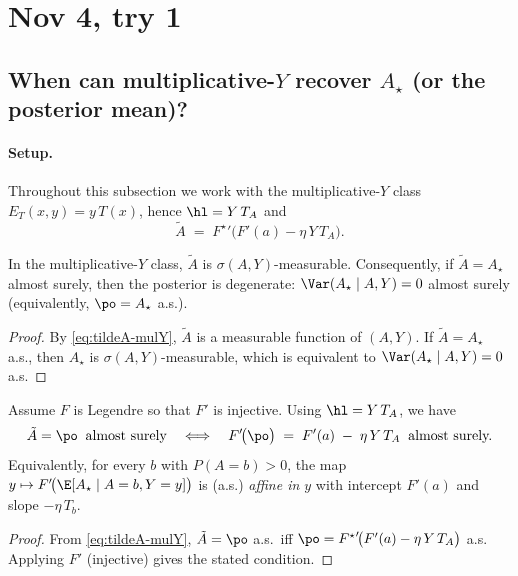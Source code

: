 \section{Nov 4, try 1}
\subsection{When can multiplicative-$Y$ recover $A_\star$ (or the posterior mean)?}

\paragraph{Setup.}
Throughout this subsection we work with the multiplicative-$Y$ class
$E_T(x,y)=y\,T(x)$, hence $\hl=Y\,T_A$ and
\begin{equation}
    \tilde{A} \;=\; {F^\star}'\!\big(F'(a)-\eta\,Y\,T_A\big).
    \label{eq:tildeA-mulY}
\end{equation}

\begin{lemma}\label{lem:measurability}
    In the multiplicative-$Y$ class, $\tilde{A}$ is $\sigma(A,Y)$-measurable.
    Consequently, if $\tilde{A}=A_\star$ almost surely, then the posterior is
    degenerate: $\Var(A_\star\mid A,Y)=0$ almost surely (equivalently,
    $\po=A_\star$ a.s.).
\end{lemma}

\begin{proof}
    By \eqref{eq:tildeA-mulY}, $\tilde{A}$ is a measurable function of $(A,Y)$.
    If $\tilde{A}=A_\star$ a.s., then $A_\star$ is $\sigma(A,Y)$-measurable,
    which is equivalent to $\Var(A_\star\mid A,Y)=0$ a.s.
\end{proof}

\begin{proposition}[Characterization: $\tilde{A}=\po$ a.s. in the multiplicative-$Y$ class]
    \label{prop:mulY-po-iff}
    Assume $F$ is Legendre so that $F'$ is injective. Using $\hl=Y\,T_A$, we have
    \[
        \tilde{A}=\po \;\; \text{almost surely}
        \quad\Longleftrightarrow\quad
        F'\!\big(\po\big) \;=\; F'(a)\;-\;\eta\,Y\,T_A \;\; \text{almost surely.}
    \]
    Equivalently, for every $b$ with $P(A=b)>0$, the map
    $y\mapsto F'\!\big(\E[A_\star\mid A=b,Y=y]\big)$ is (a.s.) \emph{affine in $y$}
    with intercept $F'(a)$ and slope $-\eta\,T_b$.
\end{proposition}

\begin{proof}
    From \eqref{eq:tildeA-mulY}, $\tilde{A}=\po$ a.s.\ iff
    \(
    \po={F^\star}'\!\big(F'(a)-\eta\,Y\,T_A\big)
    \)
    a.s. Applying $F'$ (injective) gives the stated condition.
\end{proof}


